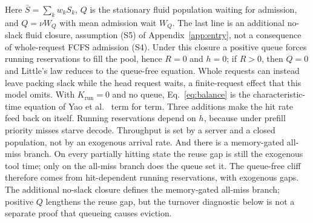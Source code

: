 Here $\bar S=\sum_kw_kS_k$, $Q$ is the stationary fluid population waiting for admission, and $Q=\nu W_Q$ with mean admission wait $W_Q$. The last line is an additional no-slack fluid closure, assumption (S5) of Appendix~\ref{app:entry}, not a consequence of whole-request FCFS admission (S4). Under this closure a positive queue forces running reservations to fill the pool, hence $R=0$ and $h=0$; if $R>0$, then $Q=0$ and Little's law reduces to the queue-free equation. Whole requests can instead leave packing slack while the head request waits, a finite-request effect that this model omits. With $K_{\mathrm{run}}=0$ and no queue, Eq.~\eqref{eq:balance} is the characteristic-time equation of Yao et al.~\citep{yao2026multiturn} term for term. Three additions make the hit rate feed back on itself. Running reservations depend on $h$, because under prefill priority misses starve decode. Throughput is set by a server and a closed population, not by an exogenous arrival rate. And there is a memory-gated all-miss branch. On every partially hitting state the reuse gap is still the exogenous tool time; only on the all-miss branch does the queue set it. The queue-free cliff therefore comes from hit-dependent running reservations, with exogenous gaps. The additional no-slack closure defines the memory-gated all-miss branch; positive $Q$ lengthens the reuse gap, but the turnover diagnostic below is not a separate proof that queueing causes eviction.

